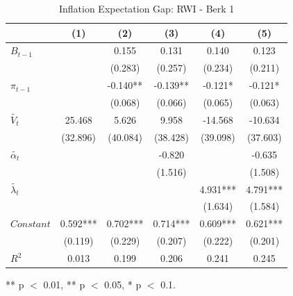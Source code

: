 \documentclass[review]{elsarticle}
\begin{document}
\begin{table}[!ht]
\centering 
  \caption{Inflation Expectation Gap: RWI - Berk 1} 
  \label{tab:Inflation Expectation Gap}
\begin{tabular}{l*{5}{c}}   
\toprule
                    & (1) & (2) & (3) & (4) & (5) \\
\midrule
$B_{t-1}$           &     & 0.155 & 0.131 & 0.140 & 0.123 \\
                    &     & (0.283) & (0.257) & (0.234) & (0.211) \\
$\pi_{t-1}$         &     & -0.140** & -0.139** & -0.121* & -0.121* \\
                    &     & (0.068) & (0.066) & (0.065) & (0.063) \\
$\tilde{V_t}$       & 25.468 & 5.626 & 9.958 & -14.568 & -10.634 \\
                    & (32.896) & (40.084) & (38.428) & (39.098) & (37.603) \\
$\tilde{\alpha_t}$  &     &     & -0.820 &     & -0.635 \\
                    &     &     & (1.516) &     & (1.508) \\
$\tilde{\lambda_t}$ &     &     &     & 4.931*** & 4.791*** \\
                    &     &     &     & (1.634) & (1.584) \\
$Constant$          & 0.592*** & 0.702*** & 0.714*** & 0.609*** & 0.621*** \\
                    & (0.119) & (0.229) & (0.207) & (0.222) & (0.201) \\
\midrule
$R^2$               & 0.013 & 0.199 & 0.206 & 0.241 & 0.245 \\
\bottomrule
\end{tabular} 
\parbox{0.8\textwidth}{\centering \small *** p $<$ 0.01, ** p $<$ 0.05, * p $<$ 0.1.}
\end{table}
\end{document}
